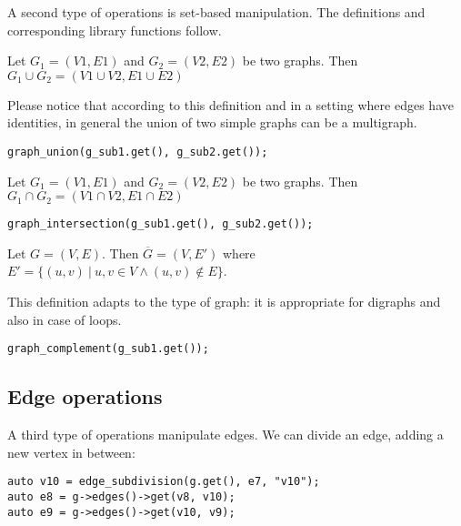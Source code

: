 A second type of operations is set-based manipulation. The definitions and corresponding library functions follow.

\begin{definition}[Union]
Let $G_1 = (V1, E1)$ and $G_2 = (V2, E2)$ be two graphs. Then $G_1 \cup G_2 = (V1 \cup V2, E1 \cup E2)$
\end{definition}

Please notice that according to this definition and in a setting where edges have identities, in general the union of two simple graphs can be a multigraph.

\begin{lstlisting}[style=c++]
graph_union(g_sub1.get(), g_sub2.get());
\end{lstlisting}

\begin{definition}[Intersection]
Let $G_1 = (V1, E1)$ and $G_2 = (V2, E2)$ be two graphs. Then $G_1 \cap G_2 = (V1 \cap V2, E1 \cap E2)$
\end{definition}

\begin{lstlisting}[style=c++]
graph_intersection(g_sub1.get(), g_sub2.get());
\end{lstlisting}

\begin{definition}[Complement]
Let $G = (V, E)$. Then $\overline{G} = (V, E')$ where $ E' = \{ (u,v) \ | \ u, v  \in V \land (u,v) \notin E \}$.
\end{definition}

This definition adapts to the type of graph: it is appropriate for digraphs and also in case of loops.

\begin{lstlisting}[style=c++]
graph_complement(g_sub1.get());
\end{lstlisting}

\subsection{Edge operations}

A third type of operations manipulate edges. We can divide an edge, adding a new vertex in between:

\begin{lstlisting}[style=c++]
auto v10 = edge_subdivision(g.get(), e7, "v10");
auto e8 = g->edges()->get(v8, v10);
auto e9 = g->edges()->get(v10, v9);
\end{lstlisting}


